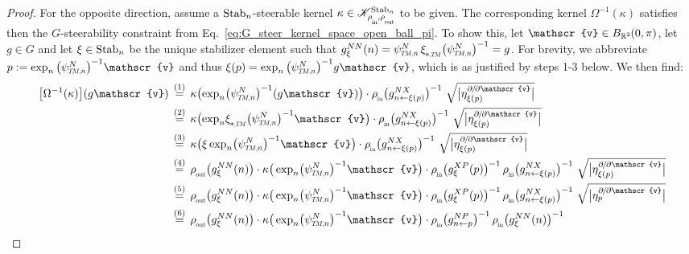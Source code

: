 \begin{proof}
    For the opposite direction, assume a $\operatorname{Stab}_{n}$-steerable kernel $\kappa\in \mathscr{K}^{\Stab{n}}_{\rhoin\mkern-1mu,\rhoout}$ to be given.
    The corresponding kernel $\Omega^{-1}(\kappa)$ satisfies then the $G$-steerability constraint from Eq.~\eqref{eq:G_steer_kernel_space_open_ball_pi}.
    To show this, let $\mathscr{v} \in B_{\R^2}\mkern-1mu(0,\pi)$, let $g\in G$ and let $\xi\in\operatorname{Stab}_{n}$ be the unique stabilizer element such that $g_\xi^{NN}(n) = \psiTMn^N\, \dxiTM \big(\psiTMn^N\big)^{-1} = g$.
    For brevity, we abbreviate $p := \exp_n \big(\psiTMn^N\big)^{-1} \mathscr{v}$ and thus $\xi(p) = \exp_n \big(\psiTMn^N\big)^{-1} g\mathscr{v}$, which is as justified by steps 1-3 below.
    We then find:
    \begin{align}
        \big[\Omega^{-1}(\kappa)\big](g\mathscr{v})
        \,&\overset{(1)}{=}\, \kappa\big(\! \exp_n\! \big(\psiTMn^N\big)^{-1} (g\mathscr{v}) \big) \cdot \rhoin\big( g_{n\leftarrow\xi(p)}^{NX} \big)^{-1}
               \ \sqrt{\big|\eta_{\xi(p)}^{\partial\mkern-2mu/\mkern-2mu\partial\mathscr{v}}\big|} \notag \\
        \,&\overset{(2)}{=}\, \kappa\big(\! \exp_n\! \dxiTM \big(\psiTMn^N\big)^{-1} \mathscr{v} \big) \cdot \rhoin\big( g_{n\leftarrow\xi(p)}^{NX} \big)^{-1}
               \ \sqrt{\big|\eta_{\xi(p)}^{\partial\mkern-2mu/\mkern-2mu\partial\mathscr{v}}\big|} \notag \\
        \,&\overset{(3)}{=}\, \kappa\big(\xi \exp_n\! \big(\psiTMn^N\big)^{-1} \mathscr{v} \big) \cdot \rhoin\big( g_{n\leftarrow\xi(p)}^{NX} \big)^{-1}
               \ \sqrt{\big|\eta_{\xi(p)}^{\partial\mkern-2mu/\mkern-2mu\partial\mathscr{v}}\big|} \notag \\
        \,&\overset{(4)}{=}\, \rhoout\big( g_\xi^{NN}(n) \big) \cdot \kappa\big(\exp_n\! \big(\psiTMn^N\big)^{-1} \mathscr{v} \big) \cdot \rhoin\big( g_\xi^{XP}(p) \big)^{-1}\, \rhoin\big( g_{n\leftarrow\xi(p)}^{NX} \big)^{-1}
               \ \sqrt{\big|\eta_{\xi(p)}^{\partial\mkern-2mu/\mkern-2mu\partial\mathscr{v}}\big|} \notag \\
        \,&\overset{(5)}{=}\, \rhoout\big( g_\xi^{NN}(n) \big) \cdot \kappa\big(\exp_n\! \big(\psiTMn^N\big)^{-1} \mathscr{v} \big) \cdot \rhoin\big( g_\xi^{XP}(p) \big)^{-1}\, \rhoin\big( g_{n\leftarrow\xi(p)}^{NX} \big)^{-1}
               \ \sqrt{\big|\eta_p^{\partial\mkern-2mu/\mkern-2mu\partial\mathscr{v}}\big|} \notag \\
        \,&\overset{(6)}{=}\, \rhoout\big( g_\xi^{NN}(n) \big) \cdot \kappa\big(\exp_n\! \big(\psiTMn^N\big)^{-1} \mathscr{v} \big) \cdot \rhoin\big( g_{n\leftarrow p}^{NP} \big)^{-1}\, \rhoin\big( g_\xi^{NN}(n) \big)^{-1}

\end{align}
\end{proof}
